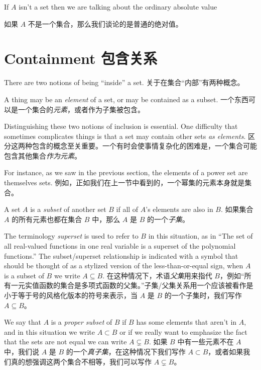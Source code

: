 If $A$ isn't a set then we are talking about the ordinary absolute value

如果 $A$ 不是一个集合，那么我们谈论的是普通的绝对值。

\clearpage 




\newpage

\section{Containment 包含关系}
\label{sec:cont}

There are two notions of being ``inside'' a set.
关于在集合“内部”有两种概念。

A thing may be
an \emph{element} of a set, or may be contained as
a subset.
一个东西可以是一个集合的\emph{元素}，或者作为子集被包含。

Distinguishing these two notions of inclusion is essential.   
One difficulty that sometimes complicates things is that  a set may contain
other sets \emph{as elements}.
区分这两种包含的概念至关重要。一个有时会使事情复杂化的困难是，一个集合可能包含其他集合\emph{作为元素}。

For instance, as we saw in the previous 
section, the elements of a power set are themselves sets.
例如，正如我们在上一节中看到的，一个幂集的元素本身就是集合。

A set $A$ is a \emph{subset} of another set $B$ if all of $A$'s elements
are also in $B$.
如果集合 $A$ 的所有元素也都在集合 $B$ 中，那么 $A$ 是 $B$ 的一个\emph{子集}。

The terminology 
\emph{superset} is used to refer
to $B$ in this situation, as in ``The set of all real-valued functions %
in one real variable is a superset of the polynomial functions.''  The 
subset/superset relationship is indicated with a symbol that should be
thought of as a stylized version of the less-than-or-equal sign, when
$A$ is a subset of $B$ we write $A \subseteq B$.
在这种情况下，术语\emph{父集}用来指代 $B$，例如“所有一元实值函数的集合是多项式函数的父集。”子集/父集关系用一个应该被看作是小于等于号的风格化版本的符号来表示，当 $A$ 是 $B$ 的一个子集时，我们写作 $A \subseteq B$。

We say that $A$ is 
a \emph{proper subset} of $B$ if $B$ has some elements that aren't in
$A$, and in this situation we write $A \subset B$ or if we really want
to emphasize the fact that the sets are not equal we can write 
$A \subsetneq B$.
如果 $B$ 中有一些元素不在 $A$ 中，我们说 $A$ 是 $B$ 的一个\emph{真子集}，在这种情况下我们写作 $A \subset B$，或者如果我们真的想强调这两个集合不相等，我们可以写作 $A \subsetneq B$。

